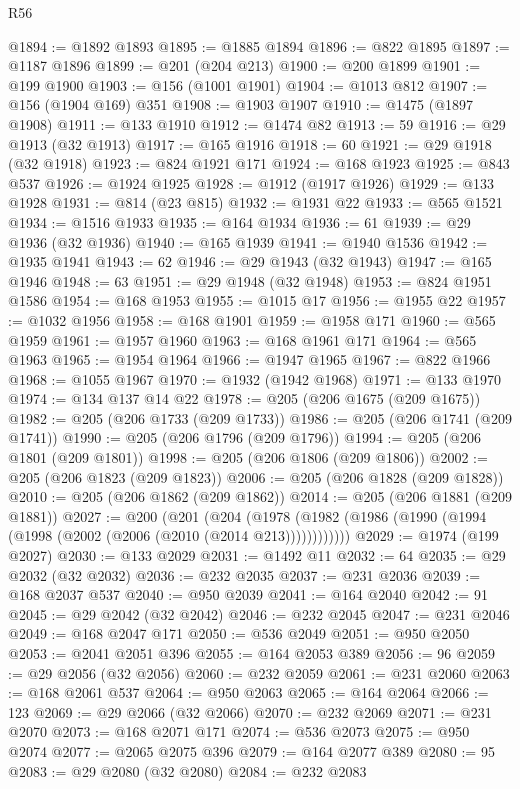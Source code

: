 \begin{lexlean}{R56}
\begin{coremodule}
@1894 := @1892 @1893
@1895 := @1885 @1894
@1896 := @822 @1895
@1897 := @1187 @1896
@1899 := @201 (@204 @213)
@1900 := @200 @1899
@1901 := @199 @1900
@1903 := @156 (@1001 @1901)
@1904 := @1013 @812
@1907 := @156 (@1904 @169) @351
@1908 := @1903 @1907
@1910 := @1475 (@1897 @1908)
@1911 := @133 @1910
@1912 := @1474 @82
@1913 := 59
@1916 := @29 @1913 (@32 @1913)
@1917 := @165 @1916
@1918 := 60
@1921 := @29 @1918 (@32 @1918)
@1923 := @824 @1921 @171
@1924 := @168 @1923
@1925 := @843 @537
@1926 := @1924 @1925
@1928 := @1912 (@1917 @1926)
@1929 := @133 @1928
@1931 := @814 (@23 @815)
@1932 := @1931 @22
@1933 := @565 @1521
@1934 := @1516 @1933
@1935 := @164 @1934
@1936 := 61
@1939 := @29 @1936 (@32 @1936)
@1940 := @165 @1939
@1941 := @1940 @1536
@1942 := @1935 @1941
@1943 := 62
@1946 := @29 @1943 (@32 @1943)
@1947 := @165 @1946
@1948 := 63
@1951 := @29 @1948 (@32 @1948)
@1953 := @824 @1951 @1586
@1954 := @168 @1953
@1955 := @1015 @17
@1956 := @1955 @22
@1957 := @1032 @1956
@1958 := @168 @1901
@1959 := @1958 @171
@1960 := @565 @1959
@1961 := @1957 @1960
@1963 := @168 @1961 @171
@1964 := @565 @1963
@1965 := @1954 @1964
@1966 := @1947 @1965
@1967 := @822 @1966
@1968 := @1055 @1967
@1970 := @1932 (@1942 @1968)
@1971 := @133 @1970
@1974 := @134 @137 @14 @22
@1978 := @205 (@206 @1675 (@209 @1675))
@1982 := @205 (@206 @1733 (@209 @1733))
@1986 := @205 (@206 @1741 (@209 @1741))
@1990 := @205 (@206 @1796 (@209 @1796))
@1994 := @205 (@206 @1801 (@209 @1801))
@1998 := @205 (@206 @1806 (@209 @1806))
@2002 := @205 (@206 @1823 (@209 @1823))
@2006 := @205 (@206 @1828 (@209 @1828))
@2010 := @205 (@206 @1862 (@209 @1862))
@2014 := @205 (@206 @1881 (@209 @1881))
@2027 := @200
    (@201
      (@204 (@1978 (@1982 (@1986 (@1990 (@1994 (@1998 (@2002 (@2006 (@2010 (@2014 @213))))))))))))
@2029 := @1974 (@199 @2027)
@2030 := @133 @2029
@2031 := @1492 @11
@2032 := 64
@2035 := @29 @2032 (@32 @2032)
@2036 := @232 @2035
@2037 := @231 @2036
@2039 := @168 @2037 @537
@2040 := @950 @2039
@2041 := @164 @2040
@2042 := 91
@2045 := @29 @2042 (@32 @2042)
@2046 := @232 @2045
@2047 := @231 @2046
@2049 := @168 @2047 @171
@2050 := @536 @2049
@2051 := @950 @2050
@2053 := @2041 @2051 @396
@2055 := @164 @2053 @389
@2056 := 96
@2059 := @29 @2056 (@32 @2056)
@2060 := @232 @2059
@2061 := @231 @2060
@2063 := @168 @2061 @537
@2064 := @950 @2063
@2065 := @164 @2064
@2066 := 123
@2069 := @29 @2066 (@32 @2066)
@2070 := @232 @2069
@2071 := @231 @2070
@2073 := @168 @2071 @171
@2074 := @536 @2073
@2075 := @950 @2074
@2077 := @2065 @2075 @396
@2079 := @164 @2077 @389
@2080 := 95
@2083 := @29 @2080 (@32 @2080)
@2084 := @232 @2083

\end{coremodule}
\end{lexlean}
